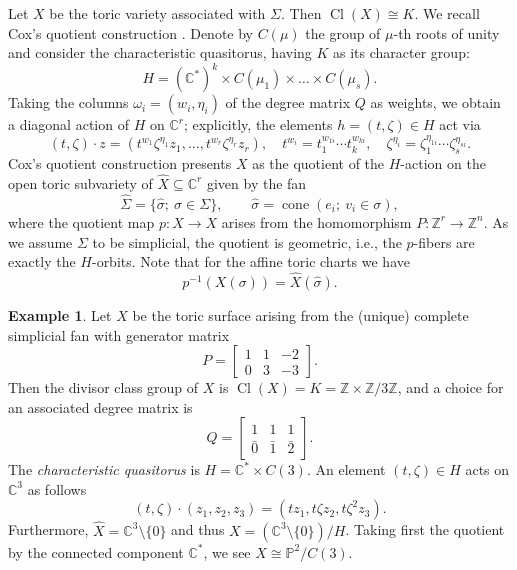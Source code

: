 \documentclass{amsart}
\newcommand{\C}{\mathbb{C}}
\newcommand{\Z}{\mathbb{Z}}
\DeclareMathOperator{\Cl}{Cl}
\DeclareMathOperator{\cone}{cone}
\theoremstyle{plain}
\theoremstyle{definition}
\newtheorem{example}[theorem]{Example}
\begin{document}
Let $X$ be the toric variety associated with $\Sigma$.
Then $\Cl(X)\cong K$.
We recall Cox's quotient construction \cite{Cox95}.
Denote by $C(\mu)$ the group of $\mu$-th roots of unity
and consider the characteristic quasitorus, having $K$
as its character group:
$$
H=(\C^*)^k\times C(\mu_1)\times\dots\times C(\mu_s).
$$
Taking the columns $\omega_i = (w_i, \eta_i)$ of the degree
matrix $Q$ as weights, we obtain a diagonal action of $H$
on $\C^r$; explicitly, the elements $h=(t,\zeta) \in H$
act via
$$
(t,\zeta)\cdot z=(t^{w_1}\zeta^{\eta_1}z_1,\dots,t^{w_r}\zeta^{\eta_r}z_r),
\quad
t^{w_i}=t_1^{w_{1i}}\cdots t_k^{w_{ki}},
\quad
\zeta^{\eta_i}=\zeta_1^{\eta_{1i}}\cdots \zeta_s^{\eta_{si}}.
$$
Cox's quotient construction presents $X$ as the quotient of the
$H$-action on the open toric subvariety of $\hat{X} \subseteq \C^r$
given by the fan
$$
\hat{\Sigma}=\{\hat{\sigma}; \ \sigma\in\Sigma\},
\qquad
\hat{\sigma}=\cone(e_i; \ v_i \in\sigma),
$$
where the quotient map $p \colon \hat{X}\rightarrow X$ arises from the
homomorphism $P \colon \Z^r\rightarrow\Z^n$.
As we assume $\Sigma$ to be simplicial, the quotient is geometric, i.e.,
the $p$-fibers are exactly the $H$-orbits.
Note that for the affine toric charts we have
$$
p^{-1}(X(\sigma)) = \hat X(\hat\sigma).
$$

\begin{example}\label{ex:1}
Let $X$ be the toric surface arising from the (unique) complete simplicial fan
with generator matrix
$$
P=\begin{bmatrix}
        1 & 1 & -2\\
        0 & 3 & -3
\end{bmatrix}.
$$
Then the divisor class group of $X$ is $\Cl(X)=K=\Z\times\Z/3\Z$, and a choice
for an associated degree matrix is
$$
Q=\begin{bmatrix}
        1 & 1 & 1\\
        \bar{0} & \bar{1} & \bar{2}
\end{bmatrix}.
$$
The \emph{characteristic quasitorus} is $H=\C^*\times C(3)$.
An element $(t,\zeta)\in H$ acts on $\C^3$ as follows
$$
(t,\zeta)\cdot(z_1,z_2,z_3)=(tz_1,t\zeta z_2,t\zeta^2 z_3).
$$
Furthermore, $\hat{X}=\C^3\setminus\{0\}$ and thus $X = (\C^3\setminus\{0\})/H$.
Taking first the quotient by the connected component $\C^*$, we see
$X\cong \mathbb P^2/C(3)$.
\end{example}
\end{document}
